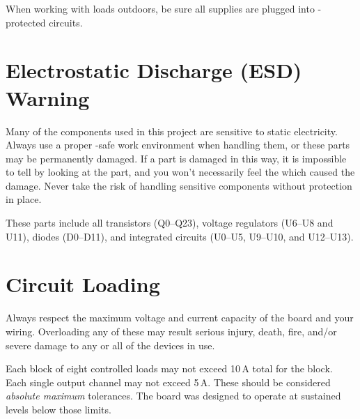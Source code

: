 \documentclass[letterpaper,twoside,onecolumn,openright,final]{memoir}
\begin{document}
When working with loads outdoors, be sure all supplies are plugged into -protected
circuits.


\section{Electrostatic Discharge (ESD) Warning}
Many of the components used in this project are sensitive to static electricity.  Always use a proper
-safe work environment when handling them, or these parts may be permanently damaged.  If
a part is damaged in this way, 
it is impossible to tell by looking at the part, and you won't necessarily
feel the  which caused the damage.  Never take the risk of handling sensitive components
without  protection in place.

These parts include all transistors (Q0--Q23), voltage regulators (U6--U8 and U11), diodes (D0--D11),
and integrated circuits (U0--U5, U9--U10, and U12--U13).

\section{Circuit Loading}
Always respect the maximum voltage and current capacity of the board and your wiring.  Overloading any
of these may result serious injury, death, fire, and/or severe damage to any or all of the devices in use.

Each block of eight controlled loads may not exceed 
10\,A total for the block.  
Each single output channel
may not exceed 5\,A.  These should be considered \emph{absolute maximum} tolerances.  The board was designed
to operate at sustained levels below those limits.
\end{document}
